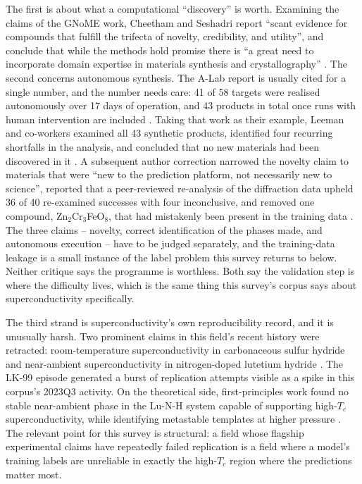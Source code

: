 \documentclass[
  11pt,
]{article}
\begin{document}
The first is about what a computational ``discovery'' is worth.
Examining the claims of the GNoME work, Cheetham and Seshadri report
``scant evidence for compounds that fulfill the trifecta of novelty,
credibility, and utility'', and conclude that while the methods hold
promise there is ``a great need to incorporate domain expertise in
materials synthesis and crystallography''
\citep{cheetham2024artificial}. The second concerns autonomous
synthesis. The A-Lab report is usually cited for a single number, and
the number needs care: 41 of 58 targets were realised autonomously over
17 days of operation, and 43 products in total once runs with human
intervention are included \citep{szymanski2023autonomous}. Taking that
work as their example, Leeman and co-workers examined all 43 synthetic
products, identified four recurring shortfalls in the analysis, and
concluded that no new materials had been discovered in it
\citep{leeman2024challenges}. A subsequent author correction narrowed
the novelty claim to materials that were ``new to the prediction
platform, not necessarily new to science'', reported that a
peer-reviewed re-analysis of the diffraction data upheld 36 of 40
re-examined successes with four inconclusive, and removed one compound,
Zn\(_2\)Cr\(_3\)FeO\(_8\), that had mistakenly been present in the
training data \citep{szymanski2026correction}. The three claims --
novelty, correct identification of the phases made, and autonomous
execution -- have to be judged separately, and the training-data leakage
is a small instance of the label problem this survey returns to below.
Neither critique says the programme is worthless. Both say the
validation step is where the difficulty lives, which is the same thing
this survey's corpus says about superconductivity specifically.

The third strand is superconductivity's own reproducibility record, and
it is unusually harsh. Two prominent claims in this field's recent
history were retracted: room-temperature superconductivity in
carbonaceous sulfur hydride \citep{snider2020retracted} and near-ambient
superconductivity in nitrogen-doped lutetium hydride
\citep{dasenbrock2023retracted}. The LK-99 episode \citep{lee2023lk99}
generated a burst of replication attempts visible as a spike in this
corpus's 2023Q3 activity. On the theoretical side, first-principles work
found no stable near-ambient phase in the Lu-N-H system capable of
supporting high-\(T_c\) superconductivity, while identifying metastable
templates at higher pressure \citep{fang2023assessing}. The relevant
point for this survey is structural: a field whose flagship experimental
claims have repeatedly failed replication is a field where a model's
training labels are unreliable in exactly the high-\(T_c\) region where
the predictions matter most.
\end{document}
